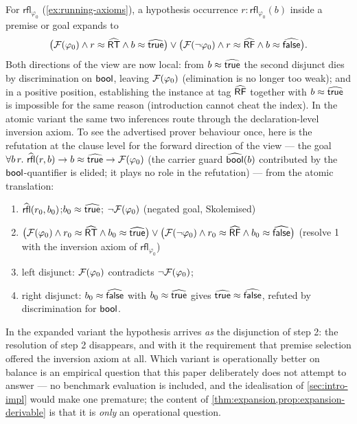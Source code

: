 \begin{example}
\label{ex:reflect-expansion}
For $\mathsf{rfl}_{\varphi_0}$ (\cref{ex:running-axioms}), a hypothesis
occurrence $r : \mathsf{rfl}_{\varphi_0}(b)$ inside a premise or goal
expands to
\[
  \bigl(\mathcal{F}(\varphi_0) \wedge r \approx \widehat{\mathsf{RT}} \wedge b \approx
  \widehat{\mathsf{true}}\bigr) \vee
  \bigl(\mathcal{F}(\neg\varphi_0) \wedge r \approx \widehat{\mathsf{RF}} \wedge b \approx
  \widehat{\mathsf{false}}\bigr).
\]
Both directions of the view are now local: from $b \approx \widehat{\mathsf{true}}$
the second disjunct dies by discrimination on $\mathsf{bool}$, leaving
$\mathcal{F}(\varphi_0)$ (elimination is no longer too weak); and in a positive
position, establishing the instance at tag $\widehat{\mathsf{RF}}$ together
with $b \approx \widehat{\mathsf{true}}$ is impossible for the same reason
(introduction cannot cheat the index).  In the atomic variant the same
two inferences route through the declaration-level inversion axiom.
To see the advertised prover behaviour once, here is the refutation at
the clause level for the forward direction of the view --- the goal
$\forall b\,r.\ \Ihat{\mathsf{rfl}}(r,b) \to b \feq \Ihat{\cstrue} \to
\F{\varphi_0}$ (the carrier guard $\widehat{\mathsf{bool}}(b)$ contributed by the
$\mathsf{bool}$-quantifier is elided; it plays no role in the refutation) ---
from the atomic translation:
\begin{enumerate}[leftmargin=2.5em]
\item $\widehat{\mathsf{rfl}}(r_0, b_0)$;\quad $b_0 \approx \widehat{\mathsf{true}}$;
  \quad $\neg\mathcal{F}(\varphi_0)$ \hfill (negated goal, Skolemised)
\item $\bigl(\mathcal{F}(\varphi_0) \wedge r_0 \approx \widehat{\mathsf{RT}} \wedge b_0
  \approx \widehat{\mathsf{true}}\bigr) \vee \bigl(\mathcal{F}(\neg\varphi_0) \wedge r_0
  \approx \widehat{\mathsf{RF}} \wedge b_0 \approx \widehat{\mathsf{false}}\bigr)$
  \hfill (resolve 1 with the inversion axiom of
  $\mathsf{rfl}_{\varphi_0}$)
\item left disjunct: $\mathcal{F}(\varphi_0)$ contradicts $\neg\mathcal{F}(\varphi_0)$;
\item right disjunct: $b_0 \approx \widehat{\mathsf{false}}$ with $b_0 \approx
  \widehat{\mathsf{true}}$ gives $\widehat{\mathsf{true}} \approx \widehat{\mathsf{false}}$, refuted
  by discrimination for $\mathsf{bool}$.
\end{enumerate}
In the expanded variant the hypothesis arrives \emph{as} the
disjunction of step 2: the resolution of step 2 disappears, and with
it the requirement that premise selection offered the inversion axiom
at all.  Which variant is operationally better on balance is an
empirical question that this paper deliberately does not attempt to
answer --- no benchmark evaluation is included, and the idealisation
of \cref{sec:intro-impl} would make one premature; the content of
\cref{thm:expansion,prop:expansion-derivable} is that it is
\emph{only} an operational question.
\end{example}

